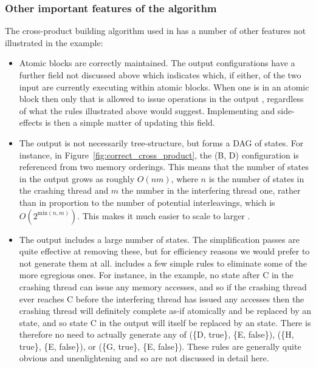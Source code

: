 \subsubsection{Other important features of the algorithm}

The cross-product building algorithm used in {\implementation} has a
number of other features not illustrated in the example:

\begin{itemize}
\item
  Atomic blocks are correctly maintained.  The output {\StateMachine}
  configurations have a further field not discussed above which
  indicates which, if either, of the two input {\StateMachines} are
  currently executing within atomic blocks.  When one {\StateMachine}
  is in an atomic block then only that {\StateMachine} is allowed to
  issue operations in the output {\StateMachine}, regardless of what
  the rules illustrated above would suggest.  Implementing
   and  side-effects is then a
  simple matter of updating this field.

\item The output {\StateMachine} is not necessarily tree-structure,
  but forms a DAG of states.  For instance, in
  Figure~\ref{fig:correct_cross_product}, the (B, D) configuration is
  referenced from two memory orderings.  This means that the number of
  states in the output {\StateMachine} grows as roughly $O(nm)$, where
  $n$ is the number of states in the crashing thread {\StateMachine}
  and $m$ the number in the interfering thread one, rather than in
  proportion to the number of potential interleavings, which is
  $O(2^{\mathrm{min}(n,m)})$.  This makes it much easier to scale
  {\technique} to larger {\StateMachines}.

\item The output {\StateMachine} includes a large number of
   states.  The {\StateMachine} simplification passes
  are quite effective at removing these, but for efficiency reasons we
  would prefer to not generate them at all.  {\Implementation}
  includes a few simple rules to eliminate some of the more egregious
  ones.  For instance, in the example, no state after C in the
  crashing thread {\StateMachine} can issue any memory accesses, and
  so if the crashing thread ever reaches C before the interfering
  thread has issued any accesses then the crashing thread will
  definitely complete as-if atomically and be replaced by an
   state, and so state C in the output
        {\StateMachine} will itself be replaced by an
         state.  There is therefore no need to
        actually generate any of (\{D, true\}, \{E, false\}), (\{H,
        true\}, \{E, false\}), or (\{G, true\}, \{E, false\}).  These
        rules are generally quite obvious and unenlightening and so
        are not discussed in detail here.
\end{itemize}

